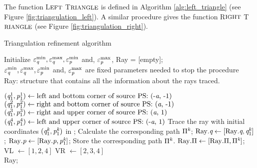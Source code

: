 The function L$\footnotesize{\textrm{EFT}}$ T$\footnotesize{\textrm{RIANGLE}}$ is defined in Algorithm \ref{alg:left_triangle} (see Figure \ref{fig:triangulation_left}). 
A similar procedure gives the function R$\footnotesize{\textrm{IGHT}}$ T$\footnotesize{\textrm{RIANGLE}}$ (see Figure \ref{fig:triangulation_right}).
\begin{algorithm}[h]
\caption{Triangulation refinement algorithm}\label{alg:triangulation}
Initialize $\varepsilon_{\textit{q}}^{\textrm{min}}, \varepsilon_{\textit{q}}^{\textrm{max}}, \varepsilon_{\textit{p}}^{\textrm{min}}$ and,
 $\varepsilon_{\textit{p}}^{\textrm{max}}$, Ray = [empty];\\
\Comment $\varepsilon_{\textit{q}}^{\textrm{min}}, \varepsilon_{\textit{q}}^{\textrm{max}}, \varepsilon_{\textit{p}}^{\textrm{min}}$ and,
 $\varepsilon_{\textit{p}}^{\textrm{max}}$ are fixed parameters needed to stop the procedure\\
\Comment Ray: structure that contains all the information about the rays traced.
\begin{algorithmic}[1]
\State $(\textit{q}_1^1, \textit{p}_1^1)\gets \mbox{left and bottom corner of source PS: (-\textit{a}, -1)}$
\State $(\textit{q}_1^2, \textit{p}_1^2) \gets \mbox{right and bottom corner of source PS:  (\textit{a}, -1)}$
\State $(\textit{q}_1^3, \textit{p}_1^3)  \gets \mbox{right and upper corner of source PS: (\textit{a}, 1)}$
\State $(\textit{q}_1^4, \textit{p}_1^4) \gets \mbox{left and upper corner of source PS: (-\textit{a}, 1)} $
\State Trace the ray with initial coordinates $(\textit{q}_1^{\textit{k}}, \textit{p}_1^{\textit{k}})$ in ;
\State Calculate the corresponding path $\Pi^{\textit{k}}$;
\State $\mbox{Ray}.\textit{q}\gets [\mbox{Ray}.\textit{q}, \textit{q}_1^{\textit{k}}]$;
\State $\mbox{Ray}.\textit{p}\gets [\mbox{Ray}.\textit{p}, \textit{p}_1^{\textit{k}}]$;
\State Store the corresponding path $\Pi^{\textit{k}}$.
\State $\mbox{Ray}.\Pi\gets [\mbox{Ray}.\Pi, \Pi^{\textit{k}}]$;
\EndFor
\State VL $\gets [1, 2, 4]$ 
\State VR $\gets [2,3, 4]$   
\State {} 
\State {}  \\
\Return Ray;
\end{algorithmic}
\end{algorithm}
